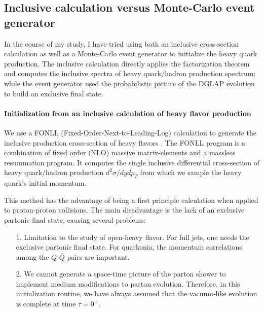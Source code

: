 \subsection{Inclusive calculation versus Monte-Carlo event generator}
In the course of my study, I have tried using both an inclusive cross-section calculation as well as a Monte-Carlo event generator to initialize the heavy quark production.
The inclusive calculation directly applies the factorization theorem and computes the inclusive spectra of heavy quark/hadron production spectrum; while the event generator used the probabilistic picture of the DGLAP evolution to build an exclusive final state.

\paragraph{Initialization from an inclusive calculation of heavy flavor production}
We use a  FONLL (Fixed-Order-Next-to-Leading-Log) calculation to generate the inclusive production cross-section of heavy flavors \cite{Cacciari:1998it}.
The FONLL program is a combination of fixed order (NLO) massive matrix-elements and a massless resummation program.
It computes the single inclusive differential cross-section of heavy quark/hadron production $d^2\sigma/dydp_T$ from which we sample the heavy quark's initial momentum.

This method has the advantage of being a first principle calculation when applied to proton-proton collisions. 
The main disadvantage is the lack of an exclusive partonic final state, causing several problems:
\begin{itemize}
\item[1.] Limitation to the study of open-heavy flavor.
For full jets, one needs the exclusive partonic final state. For quarkonia, the momentum correlations among the $Q$-$\bar{Q}$ pairs are important.
\item[2.] We cannot generate a space-time picture of the parton shower to implement medium modifications to parton evolution. 
Therefore, in this initialization routine, we have always assumed that the vacuum-like evolution is complete at time $\tau=0^{+}$.
\end{itemize}

